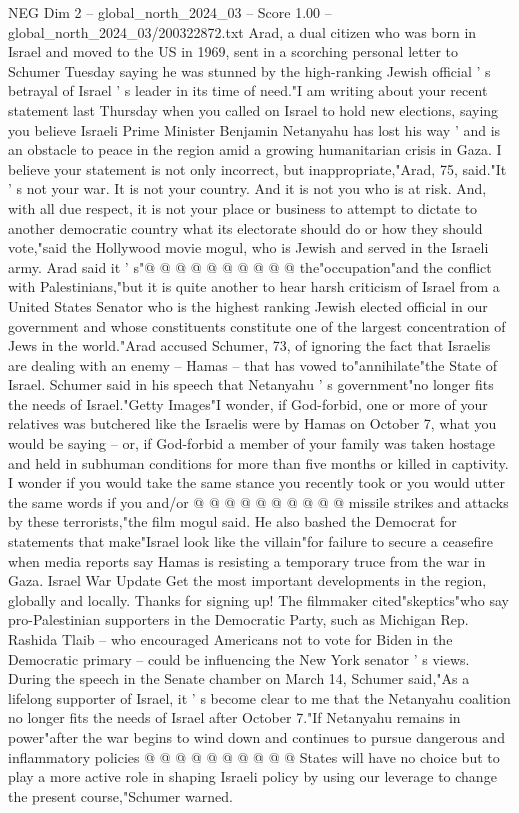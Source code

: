 \begin{textsample}{NEG Dim 2 – global\_north\_2024\_03 – Score 1.00 – global\_north\_2024\_03/200322872.txt}  \label{ex:f2_neg_347}
Arad, a dual citizen who was born in Israel and moved to the US in 1969, sent in a scorching personal letter to Schumer Tuesday saying he was stunned by the high-ranking Jewish official ' s betrayal of Israel ' s leader in its time of need."I am writing about your recent statement last Thursday when you called on Israel to hold new elections, saying you believe Israeli Prime Minister Benjamin Netanyahu has lost his way ' and is an obstacle to peace in the region amid a growing humanitarian crisis in Gaza.
I believe your statement is not only incorrect, but inappropriate,"Arad, 75, said."It ' s not your war.
It is not your country.
And it is not you who is at risk.
And, with all due respect, it is not your place or business to attempt to dictate to another democratic country what its electorate should do or how they should vote,"said the Hollywood movie mogul, who is Jewish and served in the Israeli army.
Arad said it ' s"@ @ @ @ @ @ @ @ @ @ the"occupation"and the conflict with Palestinians,"but it is quite another to hear harsh criticism of Israel from a United States Senator who is the highest ranking Jewish elected official in our government and whose constituents constitute one of the largest concentration of Jews in the world."Arad accused Schumer, 73, of ignoring the fact that Israelis are dealing with an enemy -- Hamas -- that has vowed to"annihilate"the State of Israel.
Schumer said in his speech that Netanyahu ' s government"no longer fits the needs of Israel."Getty Images"I wonder, if God-forbid, one or more of your relatives was butchered like the Israelis were by Hamas on October 7, what you would be saying -- or, if God-forbid a member of your family was taken hostage and held in subhuman conditions for more than five months or killed in captivity.
I wonder if you would take the same stance you recently took or you would utter the same words if you and/or @ @ @ @ @ @ @ @ @ @ missile strikes and attacks by these terrorists,"the film mogul said.
He also bashed the Democrat for statements that make"Israel look like the villain"for failure to secure a ceasefire when media reports say Hamas is resisting a temporary truce from the war in Gaza.
Israel War Update Get the most important developments in the region, globally and locally.
Thanks for signing up!
The filmmaker cited"skeptics"who say pro-Palestinian supporters in the Democratic Party, such as Michigan Rep.
Rashida Tlaib -- who encouraged Americans not to vote for Biden in the Democratic primary -- could be influencing the New York senator ' s views.
During the speech in the Senate chamber on March 14, Schumer said,"As a lifelong supporter of Israel, it ' s become clear to me that the Netanyahu coalition no longer fits the needs of Israel after October 7."If Netanyahu remains in power"after the war begins to wind down and continues to pursue dangerous and inflammatory policies @ @ @ @ @ @ @ @ @ @ States will have no choice but to play a more active role in shaping Israeli policy by using our leverage to change the present course,"Schumer warned.

\end{textsample}
